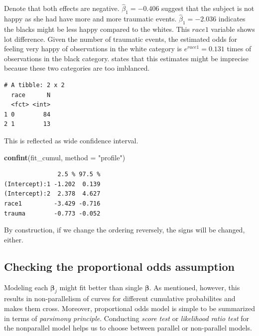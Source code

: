 \documentclass[]{book}
\newenvironment{Shaded}{\begin{snugshade}}{\end{snugshade}}
\newcommand{\DataTypeTok}[1]{\textcolor[rgb]{0.13,0.29,0.53}{#1}}
\newcommand{\KeywordTok}[1]{\textcolor[rgb]{0.13,0.29,0.53}{\textbf{#1}}}
\newcommand{\NormalTok}[1]{#1}
\newcommand{\StringTok}[1]{\textcolor[rgb]{0.31,0.60,0.02}{#1}}
\begin{document}
Denote that both effects are negative. \(\hat\beta_1 = -0.406\) suggest that the subject is not happy as she had have more and more traumatic events. \(\hat\beta_1 = -2.036\) indicates the blacks might be less happy compared to the whites. This \(race1\) variable shows lot difference. Given the number of traumatic events, the estimated odds for feeling very happy of observations in the white category is \(e^{race1} = 0.131\) times of observations in the black category. \citet{Agresti:2013aa} states that this estimates might be imprecise because these two categories are too imblanced.

\begin{verbatim}
# A tibble: 2 x 2
  race      N
  <fct> <int>
1 0        84
2 1        13
\end{verbatim}

This is reflected as wide confidence interval.

\begin{Shaded}
\begin{Highlighting}[]
\KeywordTok{confint}\NormalTok{(fit_cumul, }\DataTypeTok{method =} \StringTok{"profile"}\NormalTok{)}
\end{Highlighting}
\end{Shaded}

\begin{verbatim}
               2.5 % 97.5 %
(Intercept):1 -1.202  0.139
(Intercept):2  2.378  4.627
race1         -3.429 -0.716
trauma        -0.773 -0.052
\end{verbatim}

By construction, if we change the ordering reversely, the signs will be changed, either.

\hypertarget{checking-the-proportional-odds-assumption}{%
\subsection{Checking the proportional odds assumption}\label{checking-the-proportional-odds-assumption}}

Modeling each \(\boldsymbol\beta_j\) might fit better than single \(\boldsymbol\beta\). As mentioned, however, this results in non-parallelism of curves for different cumulative probabilites and makes them cross. Moreover, proportional odds model is simple to be summarized in terms of \emph{parsimony principle}. Conducting \emph{score test} or \emph{likelihood ratio test} for the nonparallel model helps us to choose between parallel or non-parallel models.
\end{document}

